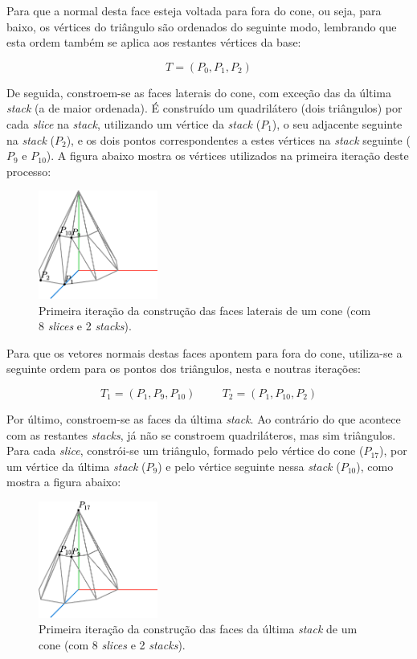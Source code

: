 \documentclass[12pt, a4paper]{article}
\begin{document}
Para que a normal desta face esteja voltada para fora do cone, ou seja, para baixo, os vértices do
triângulo são ordenados do seguinte modo, lembrando que esta ordem também se aplica aos restantes
vértices da base:

$$
T = (P_0, P_1, P_2)
$$

De seguida, constroem-se as faces laterais do cone, com exceção das da última \emph{stack} (a de
maior ordenada). É construído um quadrilátero (dois triângulos) por cada \emph{slice} na
\emph{stack}, utilizando um vértice da \emph{stack} ($P_1$), o seu adjacente seguinte na
\emph{stack} ($P_2$), e os dois pontos correspondentes a estes vértices na \emph{stack} seguinte
($P_9$ e $P_{10}$). A figura abaixo mostra os vértices utilizados na primeira iteração deste
processo:

\begin{figure}[H]
    \centering
    \includegraphics[width=0.35\textwidth]{res/figures/Cone4.pdf}
    \caption{
        \onehalfspacing
        Primeira iteração da construção das faces laterais de um cone (com 8 \emph{slices} e 2
        \emph{stacks}).
    }
\end{figure}

Para que os vetores normais destas faces apontem para fora do cone, utiliza-se a seguinte ordem para
os pontos dos triângulos, nesta e noutras iterações:

$$
T_1 = (P_1, P_9, P_{10})
\hspace{1cm}
T_2 = (P_1, P_{10}, P_2)
$$

Por último, constroem-se as faces da última \emph{stack}. Ao contrário do que acontece com as
restantes \emph{stacks}, já não se constroem quadriláteros, mas sim triângulos. Para cada
\emph{slice}, constrói-se um triângulo, formado pelo vértice do cone ($P_{17}$), por um vértice da
última \emph{stack} ($P_9$) e pelo vértice seguinte nessa \emph{stack} ($P_{10}$), como mostra a
figura abaixo:

\begin{figure}[H]
    \centering
    \includegraphics[width=0.35\textwidth]{res/figures/Cone5.pdf}
    \caption{
        \onehalfspacing
        Primeira iteração da construção das faces da última \emph{stack} de um cone (com 8
        \emph{slices} e 2 \emph{stacks}).
    }
\end{figure}
\end{document}
